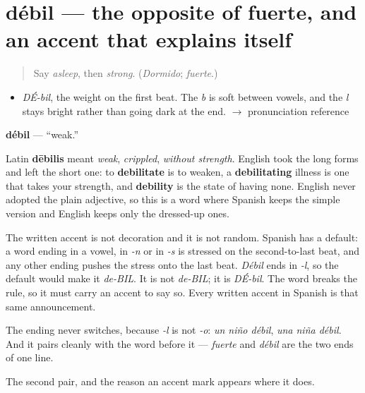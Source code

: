 \section[débil]{débil — the opposite of fuerte, and an accent that explains itself}

\label{lesson:ES-C327-debil}



\begin{quote}
Say \emph{asleep}, then \emph{strong}. (\emph{Dormido}; \emph{fuerte}.)
\end{quote}

\begin{sounds}
\begin{itemize}
\raggedright
  \item \emph{DÉ-bil}, the weight on the first beat. The \emph{b} is soft between vowels, and the \emph{l} stays bright rather than going dark at the end. $\to$ pronunciation reference
\end{itemize}
\end{sounds}

\begin{cousinweb}
\textbf{débil} — \textquotedblleft{}weak.\textquotedblright{}

Latin \textbf{dēbilis} meant \emph{weak}, \emph{crippled}, \emph{without strength}. English took the long forms and left the short one: to \textbf{debilitate} is to weaken, a \textbf{debilitating} illness is one that takes your strength, and \textbf{debility} is the state of having none. English never adopted the plain adjective, so this is a word where Spanish keeps the simple version and English keeps only the dressed-up ones.

The written accent is not decoration and it is not random. Spanish has a default: a word ending in a vowel, in \emph{-n} or in \emph{-s} is stressed on the second-to-last beat, and any other ending pushes the stress onto the last beat. \emph{Débil} ends in \emph{-l}, so the default would make it \emph{de-BIL}. It is not \emph{de-BIL}; it is \emph{DÉ-bil}. The word breaks the rule, so it must carry an accent to say so. Every written accent in Spanish is that same announcement.

The ending never switches, because \emph{-l} is not \emph{-o}: \emph{un niño débil}, \emph{una niña débil}. And it pairs cleanly with the word before it — \emph{fuerte} and \emph{débil} are the two ends of one line.
\end{cousinweb}

\begin{grammarlens}[title={What you've built}]
The second pair, and the reason an accent mark appears where it does.
\end{grammarlens}

